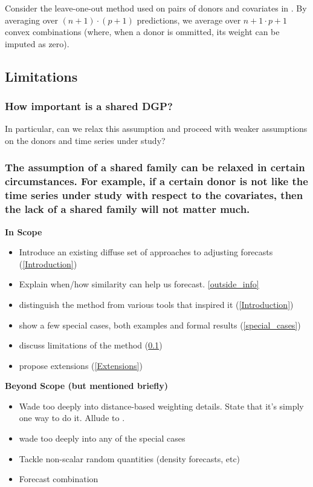 \documentclass[11pt]{article}
\theoremstyle{definition}
\begin{document}
Consider the leave-one-out method used on pairs of donors and covariates in \cite{lundquist2024volatility}.  By averaging over $(n+1)\cdot (p+1)$ predictions, we average over $n+1 \cdot p + 1$ convex combinations (where, when a donor is ommitted, its weight can be imputed as zero).

\subsection{Limitations}\label{Limitations}

\subsubsection{How important is a shared DGP?}
In particular, can we relax this assumption and proceed with weaker assumptions on the donors and time series under study?

\subsubsection{The assumption of a shared family can be relaxed in certain circumstances.  For example, if a certain donor is not like the time series under study with respect to the covariates, then the lack of a shared family will not matter much.}


\textbf{In Scope}
\begin{itemize}
  \item Introduce an existing diffuse set of approaches to adjusting forecasts (\ref{Introduction})
  \item Explain when/how similarity can help us forecast. \ref{outside_info}
  \item distinguish the method from various tools that inspired it (\ref{Introduction})
  \item show a few special cases, both examples and formal results (\ref{special_cases})
  \item discuss limitations of the method (\ref{Limitations})
  \item propose extensions (\ref{Extensions})
\end{itemize}
\textbf{Beyond Scope (but mentioned briefly)}
\begin{itemize}
  \item Wade too deeply into distance-based weighting details.  State that it's simply one way to do it.  Allude to \cite{lin2021minimizing,lundquist2024volatility}.
  \item wade too deeply into any of the special cases
  \item Tackle non-scalar random quantities (density forecasts, etc)
  \item Forecast combination
\end{itemize}
\end{document}
